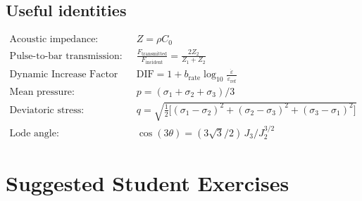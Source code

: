 \documentclass[11pt,a4paper]{article}
\newcommand{\sig}{\sigma}
\newcommand{\eps}{\varepsilon}
\newcommand{\epsdot}{\dot\eps}
\newcommand{\Cz}{C_0}
\begin{document}
\subsection{Useful identities}
\begin{align*}
  \text{Acoustic impedance:}\quad & Z = \rho \Cz \\
  \text{Pulse-to-bar transmission:}\quad
    & \frac{F_{\text{transmitted}}}{F_{\text{incident}}}
      = \frac{2 Z_2}{Z_1 + Z_2} \\
  \text{Dynamic Increase Factor (rate hardening):}\quad
    & \text{DIF} = 1 + b_{\text{rate}} \log_{10}\!\frac{\epsdot}{\epsdot_{\text{ref}}} \\
  \text{Mean pressure:}\quad & p = (\sig_1 + \sig_2 + \sig_3)/3 \\
  \text{Deviatoric stress:}\quad
    & q = \sqrt{\tfrac{1}{2}\big[(\sig_1 - \sig_2)^2 + (\sig_2 - \sig_3)^2 + (\sig_3 - \sig_1)^2\big]} \\
  \text{Lode angle:}\quad
    & \cos(3\theta) = (3\sqrt{3}/2)\,J_3/J_2^{3/2}
\end{align*}

\section{Suggested Student Exercises}
\end{document}
